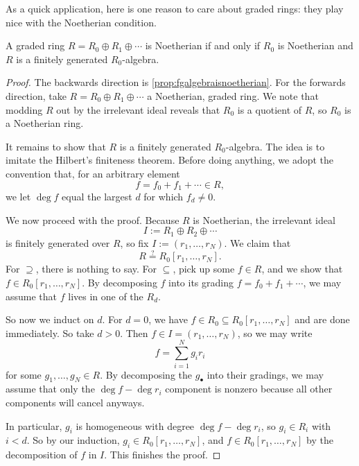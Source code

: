 As a quick application, here is one reason to care about graded rings: they play nice with the Noetherian condition.
\begin{proposition}
	A graded ring $R=R_0\oplus R_1\oplus\cdots$ is Noetherian if and only if $R_0$ is Noetherian and $R$ is a finitely generated $R_0$-algebra.
\end{proposition}
\begin{proof}
	The backwards direction is \autoref{prop:fgalgebraisnoetherian}. For the forwards direction, take $R=R_0\oplus R_1\oplus\cdots$ a Noetherian, graded ring. We note that modding $R$ out by the irrelevant ideal reveals that $R_0$ is a quotient of $R$, so $R_0$ is a Noetherian ring.

	It remains to show that $R$ is a finitely generated $R_0$-algebra. The idea is to imitate the Hilbert's finiteness theorem. Before doing anything, we adopt the convention that, for an arbitrary element
	\[f=f_0+f_1+\cdots\in R,\]
	we let $\deg f$ equal the largest $d$ for which $f_d\ne0$.
	
	We now proceed with the proof. Because $R$ is Noetherian, the irrelevant ideal
	\[I:=R_1\oplus R_2\oplus\cdots\]
	is finitely generated over $R$, so fix $I:=(r_1,\ldots,r_N)$. We claim that
	\[R\stackrel?=R_0[r_1,\ldots,r_N].\]
	For $\supseteq$, there is nothing to say. For $\subseteq$, pick up some $f\in R$, and we show that $f\in R_0[r_1,\ldots,r_N]$. By decomposing $f$ into its grading $f=f_0+f_1+\cdots$, we may assume that $f$ lives in one of the $R_d$.

	So now we induct on $d$. For $d=0$, we have $f\in R_0\subseteq R_0[r_1,\ldots,r_N]$ and are done immediately. So take $d>0$. Then $f\in I=(r_1,\ldots,r_N)$, so we may write
	\[f=\sum_{i=1}^Ng_ir_i\]
	for some $g_1,\ldots,g_N\in R$. By decomposing the $g_\bullet$ into their gradings, we may assume that only the $\deg f-\deg r_i$ component is nonzero because all other components will cancel anyways.
	
	In particular, $g_i$ is homogeneous with degree $\deg f-\deg r_i$, so $g_i\in R_i$ with $i<d$. So by our induction, $g_i\in R_0[r_1,\ldots,r_N]$, and $f\in R_0[r_1,\ldots,r_N]$ by the decomposition of $f$ in $I$. This finishes the proof.
\end{proof}

